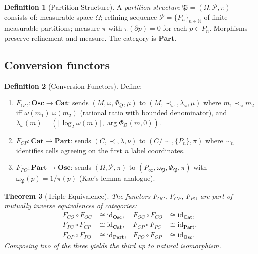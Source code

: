 \documentclass[twocolumn,10pt,a4paper]{article}
\theoremstyle{thmstyle}
\newtheorem{theorem}{Theorem}[section]
\theoremstyle{definition}
\newtheorem{definition}[theorem]{Definition}
\theoremstyle{remark}
\newcommand{\N}{\mathbb{N}}
\newcommand{\Osc}{\mathbf{Osc}}
\newcommand{\Cat}{\mathbf{Cat}}
\newcommand{\Part}{\mathbf{Part}}
\begin{document}
\begin{definition}[Partition Structure]
A \emph{partition structure} $\mathfrak{P} = (\Omega, \mathscr{P}, \pi)$
consists of: measurable space $\Omega$; refining sequence
$\mathscr{P} = \{P_n\}_{n \in \N}$ of finite measurable partitions;
measure $\pi$ with $\pi(\partial p) = 0$ for each $p \in P_n$.
Morphisms preserve refinement and measure. The category is $\Part$.
\end{definition}

\subsection{Conversion functors}

\begin{definition}[Conversion Functors]
\label{def:functors}
Define:
\begin{enumerate}[nosep,label=(\roman*)]
\item $F_{OC} : \Osc \to \Cat$: sends $(M, \omega, \Phi_\mathfrak{O}, \mu)$
to $(M, \prec_\omega, \lambda_\omega, \mu)$ where $m_1 \prec_\omega m_2$ iff
$\omega(m_1) | \omega(m_2)$ (rational ratio with bounded denominator), and
$\lambda_\omega(m) = (\lfloor\log_2\omega(m)\rfloor, \arg\Phi_\mathfrak{O}(m,0))$.
\item $F_{CP} : \Cat \to \Part$: sends $(C, \prec, \lambda, \nu)$ to
$(C/{\sim}, \{P_n\}, \pi)$ where $\sim_n$ identifies cells agreeing on
the first $n$ label coordinates.
\item $F_{PO} : \Part \to \Osc$: sends $(\Omega, \mathscr{P}, \pi)$ to
$(P_\infty, \omega_\mathfrak{P}, \Phi_\mathfrak{P}, \pi)$ with
$\omega_\mathfrak{P}(p) = 1/\pi(p)$ (Kac's lemma analogue).
\end{enumerate}
\end{definition}

\begin{theorem}[Triple Equivalence]
\label{thm:triple_equiv}
The functors $F_{OC}$, $F_{CP}$, $F_{PO}$ are part of mutually inverse
equivalences of categories:
\begin{align}
F_{CO} \circ F_{OC} &\cong \mathrm{id}_\Osc, &
F_{OC} \circ F_{CO} &\cong \mathrm{id}_\Cat, \\
F_{PC} \circ F_{CP} &\cong \mathrm{id}_\Cat, &
F_{CP} \circ F_{PC} &\cong \mathrm{id}_\Part, \\
F_{OP} \circ F_{PO} &\cong \mathrm{id}_\Part, &
F_{PO} \circ F_{OP} &\cong \mathrm{id}_\Osc.
\end{align}
Composing two of the three yields the third up to natural isomorphism.
\end{theorem}
\end{document}
